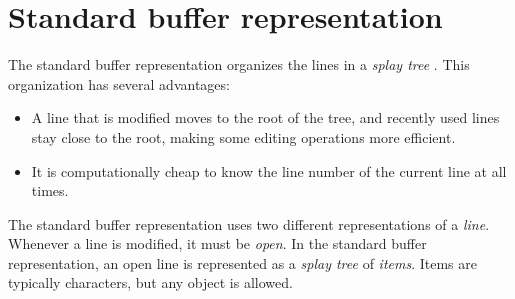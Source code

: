 \section{Standard buffer representation}

The standard buffer representation organizes the lines in a
\emph{splay tree} \cite{Sleator:1985:SBS:3828.3835}.  This
organization has several advantages:

\begin{itemize}
\item A line that is modified moves to the root of the tree, and
  recently used lines stay close to the root, making some editing
  operations more efficient.
\item It is computationally cheap to know the line number of the
  current line at all times. 
\end{itemize}

The standard buffer representation uses two different representations
of a \emph{line}.  Whenever a line is modified, it must be
\emph{open}.  In the standard buffer representation, an open line is
represented as a \emph{splay tree} \cite{Sleator:1985:SBS:3828.3835}
of \emph{items}.  Items are typically characters, but any object is
allowed.

